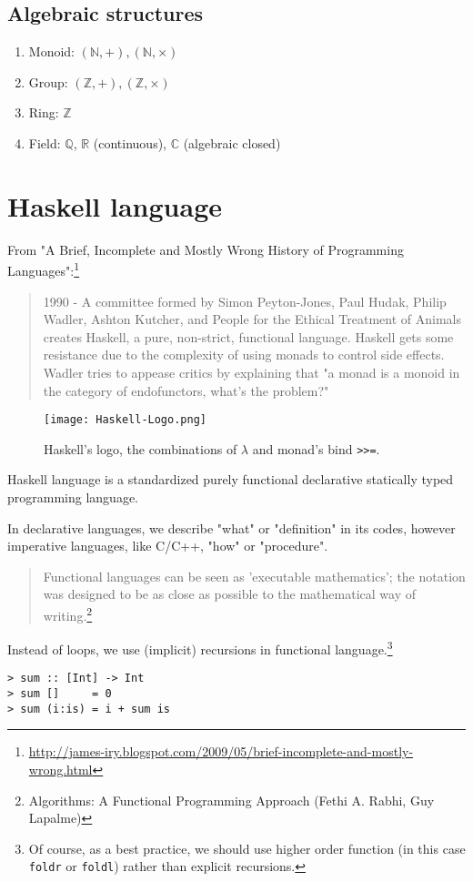 \documentclass[11pt]{book}
\begin{document}
\subsection{Algebraic structures}
\begin{enumerate}
\item Monoid: $(\mathbb{N},+), (\mathbb{N},\times)$
\item Group: $(\mathbb{Z},+), (\mathbb{Z},\times)$
\item Ring: $\mathbb{Z}$
\item Field: $\mathbb{Q}$, $\mathbb{R}$ (continuous), $\mathbb{C}$ (algebraic closed)
\end{enumerate}

\section{Haskell language}
From "A Brief, Incomplete and Mostly Wrong History of Programming Languages":\footnote{
\url{http://james-iry.blogspot.com/2009/05/brief-incomplete-and-mostly-wrong.html}
}
\begin{quotation}
1990 - A committee formed by Simon Peyton-Jones, Paul Hudak, Philip Wadler, Ashton Kutcher, and People for the Ethical Treatment of Animals creates Haskell, a pure, non-strict, functional language. Haskell gets some resistance due to the complexity of using monads to control side effects. Wadler tries to appease critics by explaining that "a monad is a monoid in the category of endofunctors, what's the problem?" 
\end{quotation}

\begin{figure}[htbp]
\begin{center}
\texttt{[image: Haskell-Logo.png]}
\caption{Haskell's logo, the combinations of $\lambda$ and monad's bind \texttt{>>=}.}
\label{Haskell-Logo}
\end{center}
\end{figure}

Haskell language is a standardized purely functional declarative statically typed programming language.

In declarative languages, we describe "what" or "definition" in its codes, however imperative languages, like C/C++, "how" or "procedure".
\begin{quotation}
Functional languages can be seen as 'executable mathematics'; the notation was designed to be as close as possible to the mathematical way of writing.\footnote{
Algorithms: A Functional Programming Approach (Fethi A. Rabhi, Guy Lapalme)
}
\end{quotation}
Instead of loops, we use (implicit) recursions in functional language.\footnote{Of course, as a best practice, we should use higher order function (in this case \texttt{foldr} or \texttt{foldl}) rather than explicit recursions.
}
\begin{verbatim}
> sum :: [Int] -> Int
> sum []     = 0
> sum (i:is) = i + sum is
\end{verbatim}
\end{document}
